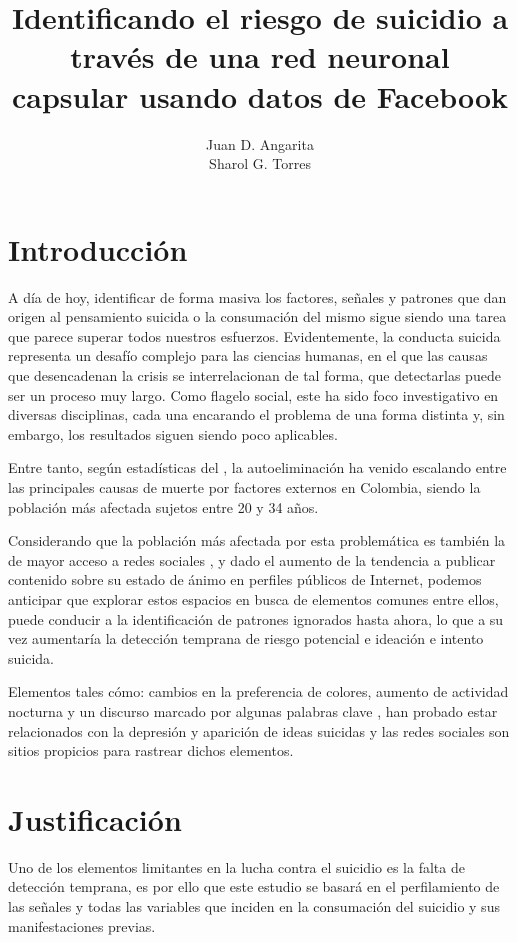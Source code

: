 \documentclass[12pt, man, donotrepeattitle, letterpaper]{apa6}
\title{Identificando el riesgo de suicidio a través de una red neuronal capsular usando datos de Facebook}
\author{Juan D. Angarita \\ Sharol G. Torres}
\affiliation{Universidad Popular del Cesar}
\begin{document}
    \maketitle
    \tableofcontents
    \newpage
    \section{Introducción}
    A día de hoy, identificar de forma masiva los factores, señales y patrones que dan origen al pensamiento suicida o la
    consumación del mismo sigue siendo una tarea que parece superar todos nuestros esfuerzos. Evidentemente, la conducta suicida representa un desafío complejo para las ciencias humanas, en el que las causas que desencadenan la crisis se interrelacionan de tal forma, que detectarlas puede ser un proceso muy largo. Como flagelo social, este ha sido foco investigativo en diversas disciplinas, cada una encarando el problema de una forma distinta y, sin embargo, los resultados siguen siendo poco aplicables. 
    
    Entre tanto, según estadísticas del \textcite{MedicinaLegal}, la autoeliminación ha venido escalando entre las principales causas de muerte por factores externos en Colombia, siendo la población más afectada sujetos entre 20 y 34 años.
    
    Considerando que la población más afectada por esta problemática es también la de mayor acceso a redes sociales \parencite{Facebook}, y dado el aumento de la tendencia a publicar contenido sobre su estado de ánimo en perfiles públicos de Internet, podemos anticipar que explorar estos espacios en busca de elementos comunes entre ellos, puede conducir a la identificación de patrones ignorados hasta ahora, lo que a su vez aumentaría la detección temprana de riesgo potencial e ideación e intento suicida.
    
    Elementos tales cómo: cambios en la preferencia de colores\parencite{Carruthers2010}, aumento de actividad nocturna \parencite{Season} y un discurso marcado por algunas palabras clave \parencite{TextAnalysis}, han probado estar relacionados con la depresión y aparición de ideas suicidas y las redes sociales son sitios propicios para rastrear dichos elementos.
    \newpage
    
    \section{Justificación}
    Uno de los elementos limitantes en la lucha contra el suicidio es la falta de detección temprana, es por ello que este estudio se basará en el perfilamiento de las señales y todas las variables que inciden en la consumación del suicidio y sus manifestaciones previas.
    
\end{document}
